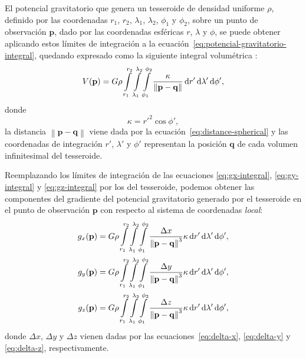 El potencial gravitatorio que genera un tesseroide de densidad uniforme $\rho$,
definido por las coordenadas $r_1$, $r_2$, $\lambda_1$, $\lambda_2$, $\phi_1$
y $\phi_2$, sobre un punto de observación $\mathbf{p}$, dado por las
coordenadas esféricas $r$, $\lambda$ y $\phi$, se puede obtener aplicando estos
límites de integración a la ecuación~\ref{eq:potencial-gravitatorio-integral},
quedando expresado como la siguiente integral volumétrica
\citep{grombein2013,uieda2016}:
%
\begin{equation}
    V(\mathbf{p}) = G \rho
        \int\limits_{r_1}^{r_2}
        \int\limits_{\lambda_1}^{\lambda_2}
        \int\limits_{\phi_1}^{\phi_2}
        \frac{\kappa}{\left\lVert \mathbf{p} - \mathbf{q} \right\rVert}
        \mathop{}\!\textnormal{d} r' \mathop{}\!\textnormal{d} \lambda' \mathop{}\!\textnormal{d} \phi',
    \label{eq:potencial-tesseroide}
\end{equation}
%
donde
%
\begin{equation}
    \kappa = {r'}^2 \cos \phi',
    \label{eq:kappa}
\end{equation}
%
la distancia $\left\lVert \mathbf{p} - \mathbf{q} \right\rVert$ viene
dada por la ecuación~\ref{eq:distance-spherical} y las coordenadas de
integración $r'$, $\lambda'$ y $\phi'$ representan la posición $\mathbf{q}$ de
cada volumen infinitesimal del tesseroide.

Reemplazando los límites de integración de las ecuaciones \ref{eq:gx-integral},
\ref{eq:gy-integral} y \ref{eq:gz-integral} por los del tesseroide, podemos
obtener las componentes del gradiente del potencial gravitatorio generado por
el tesseroide en el punto de observación $\mathbf{p}$ con respecto al
sistema de coordenadas \emph{local}:
%
\begin{align}
    g_x(\mathbf{p}) &=
        G \rho
        \int\limits_{r_1}^{r_2}
        \int\limits_{\lambda_1}^{\lambda_2}
        \int\limits_{\phi_1}^{\phi_2}
        \frac{\Delta x}{\left\lVert \mathbf{p} - \mathbf{q} \right\rVert^3}
        \kappa
        \diff r' \diff \lambda' \diff \phi',
    \label{eq:gx-tesseroide}
    \\
    g_y(\mathbf{p}) &=
        G \rho
        \int\limits_{r_1}^{r_2}
        \int\limits_{\lambda_1}^{\lambda_2}
        \int\limits_{\phi_1}^{\phi_2}
        \frac{\Delta y}{\left\lVert \mathbf{p} - \mathbf{q} \right\rVert^3}
        \kappa
        \diff r' \diff \lambda' \diff \phi',
    \label{eq:gy-tesseroide}
    \\
    g_z(\mathbf{p}) &=
        G \rho
        \int\limits_{r_1}^{r_2}
        \int\limits_{\lambda_1}^{\lambda_2}
        \int\limits_{\phi_1}^{\phi_2}
        \frac{\Delta z}{\left\lVert \mathbf{p} - \mathbf{q} \right\rVert^3}
        \kappa
        \diff r' \diff \lambda' \diff \phi',
    \label{eq:gz-tesseroide}
\end{align}
%
donde $\Delta x$, $\Delta y$ y $\Delta z$ vienen dadas por las
ecuaciones~\ref{eq:delta-x}, \ref{eq:delta-y} y \ref{eq:delta-z},
respectivamente.


